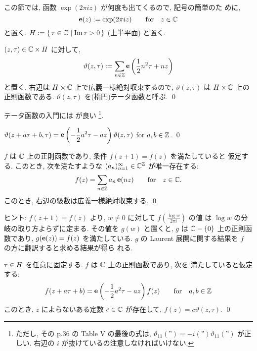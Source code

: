 \documentclass[12pt,twoside]{jarticle}
\begin{document}
この節では, 函数 $\exp(2\pi iz)$ が何度も出てくるので, 記号の簡単のた
めに,
\[
  \mathop{\mathbf{e}}\nolimits(z) := \exp(2\pi iz)
  \qquad\text{for}\quad z\in{\mathbb C}
\]%
と置く. $H := \{\, \tau \in {\mathbb C} \mid \mathop{\mathrm{Im}}\nolimits \tau > 0 \,\}$ (上半平面)
と置く.

\begin{question}[定義]
  $(z,\tau)\in{\mathbb C}\times H$ に対して,
  \[
    \vartheta(z,\tau)
    := \sum_{n\in{\mathbb Z}} \mathop{\mathbf{e}}\nolimits\left( \frac{1}{2}n^2\tau + nz \right)
  \]%
  と置く. 右辺は $H\times{\mathbb C}$ 上で広義一様絶対収束するので,
  $\vartheta(z,\tau)$ は $H\times{\mathbb C}$ 上の正則函数である. 
  $\vartheta(z,\tau)$ を(楕円)テータ函数と呼ぶ.
  \qed
\end{question}

\noindent テータ函数の入門には \cite{TataI} が良い%
%
\footnote{ただし, その p.36 の Table V の最後の式は, 
  \( \vartheta_{11}(\text{''}) = -i (\text{''})\vartheta_{11}(\text{''}) \)
  が正しい. 右辺の $i$ が抜けているの注意しなければいけない.}.
%

\begin{question}[準周期性]
  \(\displaystyle
    \vartheta(z + a\tau + b,\tau)
    = \mathop{\mathbf{e}}\nolimits\left( -\frac{1}{2}a^2\tau - az \right) \vartheta(z,\tau)
  \) \quad
  for $a,b\in{\mathbb Z}$.
  \qed
\end{question}

\begin{question}\label{q:periodic-func}
  $f$ は ${\mathbb C}$ 上の正則函数であり, 条件 $f(z+1)=f(z)$ を満たしていると
  仮定する. このとき, 次を満たすような $(a_n)_{n=1}^\infty \in {\mathbb C}^{\mathbb Z}$ 
  が唯一存在する:
  \[
    f(z) = \sum_{n\in{\mathbb Z}} a_n \mathop{\mathbf{e}}\nolimits(nz)
    \qquad\text{for}\quad z \in {\mathbb C}.
  \]%
  このとき, 右辺の級数は広義一様絶対収束する.
  \qed
\end{question}

\noindent ヒント: %
$f(z+1)=f(z)$ より, $w \ne 0$ に対して $f(\frac{\log w}{2\pi i})$ の値
は $\log w$ の分岐の取り方よらずに定まる. その値を $g(w)$ と置くと, 
$g$ は ${\mathbb C}-\{0\}$ 上の正則函数であり, $g(\mathop{\mathbf{e}}\nolimits(z))=f(z)$ を満たしている. 
$g$ の Laurent 展開に関する結果を $f$ の方に翻訳すると求める結果が得ら
れる. 

\begin{question}[準周期性による特徴付け]
  $\tau\in H$ を任意に固定する. $f$ は ${\mathbb C}$ 上の正則函数であり, 次を
  満たしていると仮定する:
  \[
     f(z + a\tau + b)
    = \mathop{\mathbf{e}}\nolimits\left( -\frac{1}{2}a^2\tau - az \right) f(z)
  \qquad\text{for}\quad a,b\in{\mathbb Z}
  \]%
  このとき, $z$ によらないある定数 $c\in{\mathbb C}$ が存在して, %
  $f(z) = c \vartheta(z,\tau)$.
  \qed
\end{question}
\end{document}
